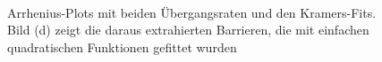 \documentclass[12pt,a4paper]{article}
\begin{document}
\begin{figure}[H]
	\\	 
	\caption{Arrhenius-Plots mit beiden Übergangsraten und den Kramers-Fits. Bild (d) zeigt die daraus extrahierten Barrieren, die mit einfachen quadratischen Funktionen gefittet wurden}
	\label{arrhstuff} 
\end{figure}
\end{document}
